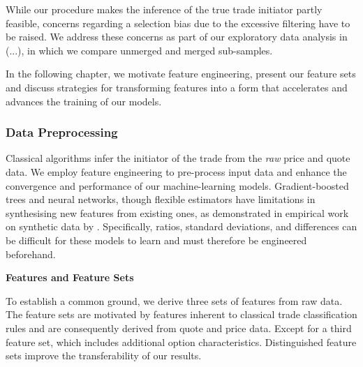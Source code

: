 While our procedure makes the inference of the true trade initiator partly feasible, concerns regarding a selection bias due to the excessive filtering have to be raised. We address these concerns as part of our exploratory data analysis in (...), in which we compare unmerged and merged sub-samples.

In the following chapter, we motivate feature engineering, present our feature sets and discuss strategies for transforming features into a form that accelerates and advances the training of our models.

\subsubsection{Data Preprocessing}\label{sec:data-preprocessing}

Classical algorithms infer the initiator of the trade from the \emph{raw} price and quote data. We employ feature engineering to pre-process input data and enhance the convergence and performance of our machine-learning models. Gradient-boosted trees and neural networks, though flexible estimators have limitations in synthesising new features from existing ones, as demonstrated in empirical work on synthetic data by \textcite[][5--6]{heatonEmpiricalAnalysisFeature2016}. Specifically, ratios, standard deviations, and differences can be difficult for these models to learn and must therefore be engineered beforehand.

\textbf{Features and Feature Sets}

To establish a common ground, we derive three sets of features from raw data. The feature sets are motivated by features inherent to classical trade classification rules and are consequently derived from quote and price data. Except for a third feature set, which includes additional option characteristics. Distinguished feature sets improve the transferability of our results.

